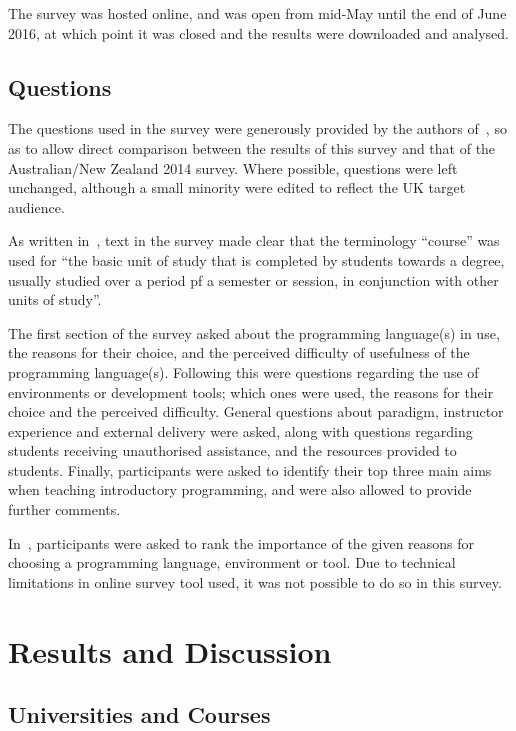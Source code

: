 \documentclass{sig-alternate}
\begin{document}
The survey was hosted online, and was open from mid-May until the end of June 2016, at which point it was closed and the results were downloaded and analysed. 
\subsection{Questions}

The questions used in the survey were generously provided by the authors of~\cite{mason+cooper:2014}, so as to allow direct comparison between the results of this survey and that of the Australian/New Zealand 2014 survey. Where possible, questions were left unchanged, although a small minority were edited to reflect the UK target audience. 

As written in~\cite{mason+cooper:2014}, text in the survey made clear that the terminology ``course'' was used for ``the basic unit of study that is completed by students towards a degree, usually studied over a period pf a semester or session, in conjunction with other units of study''. 

The first section of the survey asked about the programming language(s) in use, the reasons for their choice, and the perceived difficulty of usefulness of the programming language(s). Following this were questions regarding the use of environments or development tools; which ones were used, the reasons for their choice and the perceived difficulty. General questions about paradigm, instructor experience and external delivery were asked, along with questions regarding students receiving unauthorised assistance, and the resources provided to students. Finally, participants were asked to identify their top three main aims when teaching introductory programming, and were also allowed to provide further comments. 

In~\cite{mason+cooper:2014}, participants were asked to rank the importance of the given reasons for choosing a programming language, environment or tool. Due to technical limitations in online survey tool used, it was not possible to do so in this survey.

\section{Results and Discussion}\label{results}

\subsection{Universities and Courses}
\end{document}
